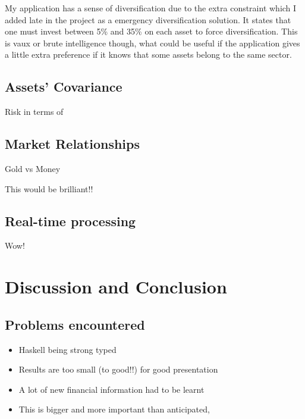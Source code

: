 \documentclass{pdfmx4020}
\begin{document}
    My application has a sense of diversification due to the extra constraint which I added late in the project as a emergency diversification solution. It states that one must invest between 5\% and 35\% on each asset to force diversification. This is vaux or brute intelligence though, what could be useful if the application gives a little extra preference if it knows that some assets belong to the same sector. 

  
  \section{Assets' Covariance} %
  \label{sec:covariance}
    Risk in terms of 

  \section{Market Relationships} %
  \label{sec:market_relationships}
    Gold vs Money

    This would be brilliant!!

  \section{Real-time processing} %
  \label{sec:real_time_processing}
    Wow!


\chapter{Discussion and Conclusion}
  
  \section{Problems encountered} %
  \label{sec:problems_encountered}
    \begin{itemize}
      \item Haskell being strong typed
      \item Results are too small (to good!!) for good presentation
      \item A lot of new financial information had to be learnt
      \item This is bigger and more important than anticipated, 
    \end{itemize}
  
\end{document}
